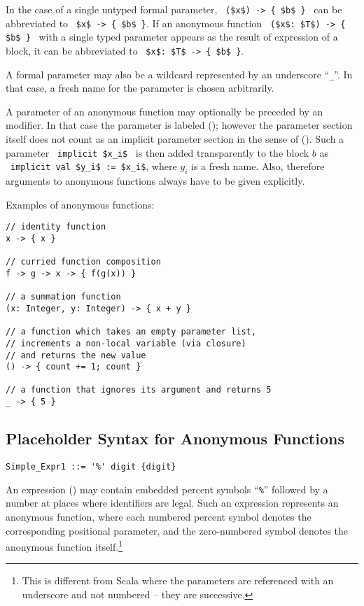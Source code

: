 In the case of a single untyped formal parameter, ~\lstinline!($x$) -> { $b$ }!~ can be abbreviated to ~\lstinline!$x$ -> { $b$ }!. If an anonymous function ~\lstinline!($x$: $T$) -> { $b$ }!~ with a single typed parameter appears as the result of expression of a block, it can be abbreviated to ~\lstinline!$x$: $T$ -> { $b$ }!.

A formal parameter may also be a wildcard represented by an underscore ``\lstinline!_!''. In that case, a fresh name for the parameter is chosen arbitrarily. 

A parameter of an anonymous function may optionally be preceded by an  modifier. In that case the parameter is labeled  (); however the parameter section itself does not count as an implicit parameter section in the sense of (). Such a parameter ~\lstinline!implicit $x_i$!~ is then added transparently to the block $b$ as ~\lstinline!implicit val $y_i$ := $x_i$!, where $y_i$ is a fresh name. Also, therefore arguments to anonymous functions always have to be given explicitly. 

\example Examples of anonymous functions:
\begin{lstlisting}
// identity function
x -> { x }

// curried function composition
f -> g -> x -> { f(g(x)) }

// a summation function
(x: Integer, y: Integer) -> { x + y }

// a function which takes an empty parameter list,
// increments a non-local variable (via closure)
// and returns the new value
() -> { count += 1; count }

// a function that ignores its argument and returns 5
_ -> { 5 }
\end{lstlisting}





\subsection{Placeholder Syntax for Anonymous Functions}
\label{sec:placeholder-functions}

\syntax\begin{lstlisting}
Simple_Expr1 ::= '%' digit {digit}
\end{lstlisting}

An expression () may contain embedded percent symbols ``\lstinline!%!'' followed by a number at places where identifiers are legal. Such an expression represents an anonymous function, where each numbered percent symbol denotes the corresponding positional parameter, and the zero-numbered symbol denotes the anonymous function itself.\footnote{This is different from Scala where the parameters are referenced with an underscore and not numbered -- they are successive.}

